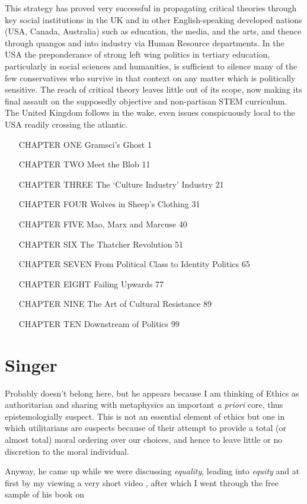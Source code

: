 \documentclass[10pt,titlepage]{book}
\begin{document}
This strategy has proved very successful in propagating critical theories through key social institutions in the UK and in other English-speaking developed nations (USA, Canada, Australia) such as education, the media, and the arts, and thence through quangos and into industry via Human Resource departments.
In the USA the preponderance of strong left wing politics in tertiary education, particularly in social sciences and humanities, is sufficient to silence many of the few conservatives who survive in that context on any matter which is politically sensitive.
The reach of critical theory leaves little out of its scope, now making its final assault on the supposedly objective and non-partisan STEM curriculum.
The United Kingdom follows in the wake, even issues conspicuously local to the USA readily crossing the atlantic.

\begin{itemize}
\item[CHAPTER ONE] Gramsci’s Ghost 1
\item[CHAPTER TWO] Meet the Blob 11
\item[CHAPTER THREE] The ‘Culture Industry’ Industry 21
\item[CHAPTER FOUR] Wolves in Sheep’s Clothing 31
\item[CHAPTER FIVE] Mao, Marx and Marcuse 40
\item[CHAPTER SIX] The Thatcher Revolution 51
\item[CHAPTER SEVEN] From Political Class to Identity Politics 65
\item[CHAPTER EIGHT] Failing Upwards 77
\item[CHAPTER NINE] The Art of Cultural Resistance 89
\item[CHAPTER TEN] Downstream of Politics 99
\end{itemize}

\section{Singer}

Probably doesn't belong here, but he appears because I am thinking of Ethics as authoritarian and sharing with metaphysics an important \emph{a priori} core, thus epistemologially suspect.
This is not an essential element of ethics but one in which utilitarians are suspects because of their attempt to provide a total (or almost total) moral ordering over our choices, and hence to leave little or no discretion to the moral individual.

Anyway, he came up while we were discussing \emph{equality}, leading into \emph{equity} and at first by my viewing a very short video \cite{singer-eqvid}, after which I went through the free sample of his book on
\end{document}
